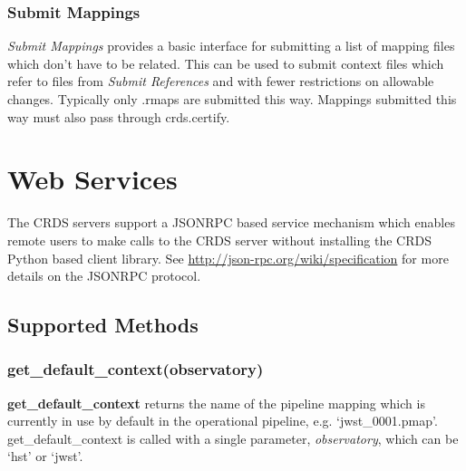 \documentclass[letterpaper,10pt,english]{sphinxmanual}
\begin{document}
\subsection{Submit Mappings}
\label{web_site_use:submit-mappings}
\emph{Submit Mappings} provides a basic interface for submitting a list of mapping
files which don't have to be related.   This can be used to submit context files
which refer to files from \emph{Submit References} and with fewer restrictions on
allowable changes.   Typically only .rmaps are submitted this way.   Mappings
submitted this way must also pass through crds.certify.
\begin{figure}[htbp]
\centering

\end{figure}


\chapter{Web Services}
\label{web_services::doc}\label{web_services:web-services}
The CRDS servers support a JSONRPC based service mechanism which enables
remote users to make calls to the CRDS server without installing the CRDS
Python based client library.   See \href{http://json-rpc.org/wiki/specification}{http://json-rpc.org/wiki/specification}
for more details on the JSONRPC protocol.


\section{Supported Methods}
\label{web_services:supported-methods}

\subsection{get\_default\_context(observatory)}
\label{web_services:get-default-context-observatory}
\textbf{get\_default\_context} returns the name of the pipeline mapping which is currently
in use by default in the operational pipeline, e.g. `jwst\_0001.pmap'.
get\_default\_context is called with a single parameter, \emph{observatory},  which can
be `hst' or `jwst'.
\end{document}

